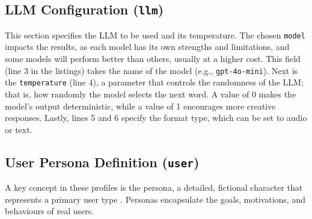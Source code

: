 \subsection{LLM Configuration (\texttt{llm})}

This section specifies the \acl{LLM} to be used and its temperature.
The chosen \texttt{model} impacts the results,
as each model has its own strengths and limitations,
and some models will perform better than others,
usually at a higher cost.
This field (line 3 in the listings) takes the name of the model
(e.g., \texttt{gpt-4o-mini}).
Next is the \texttt{temperature} (line 4),
a parameter that controls the randomness of the \ac{LLM};
that is, how randomly the model selects the next word.
A value of 0 makes the model's output deterministic,
while a value of 1 encourages more creative responses.
Lastly, lines 5 and 6 specify the format type,
which can be set to audio or text.

\subsection{User Persona Definition (\texttt{user})}

A key concept in these profiles is the persona,
a detailed, fictional character that represents a primary user type
\autocite{cooperFaceEssentialsInteraction2014}.
Personas encapsulate the goals, motivations, and behaviours of real users.

